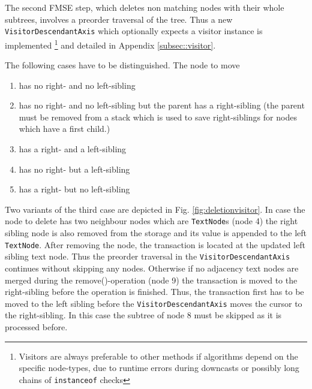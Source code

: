 The second FMSE step, which deletes non matching nodes with their whole subtrees, involves a preorder traversal of the tree. Thus a new \\\texttt{VisitorDescendantAxis} which optionally expects a visitor instance is implemented \footnote{Visitors are always preferable to other methods if algorithms depend on the specific node-types, due to runtime errors during downcasts or possibly long chains of \texttt{instanceof} checks} and detailed in Appendix \ref{subsec::visitor}. 

The following cases have to be distinguished. The node to move

\begin{enumerate}
\item has no right- and no left-sibling
\item has no right- and no left-sibling but the parent has a right-sibling (the parent must be removed from a stack which is used to save right-siblings for nodes which have a first child.)
\item has a right- and a left-sibling
\item has no right- but a left-sibling
\item has a right- but no left-sibling
\end{enumerate}

Two variants of the third case are depicted in Fig. \ref{fig:deletionvisitor}. In case the node to delete has two neighbour nodes which are \texttt{TextNode}s (node 4) the right sibling node is also removed from the storage and its value is appended to the left \texttt{TextNode}. After removing the node, the transaction is located at the updated left sibling text node. Thus the preorder traversal in the \texttt{VisitorDescendantAxis} continues without skipping any nodes. Otherwise if no adjacency text nodes are merged during the remove()-operation (node 9) the transaction is moved to the right-sibling before the operation is finished. Thus, the transaction first has to be moved to the left sibling before the \texttt{VisitorDescendantAxis} moves the cursor to the right-sibling. In this case the subtree of node 8 must be skipped as it is processed before.

